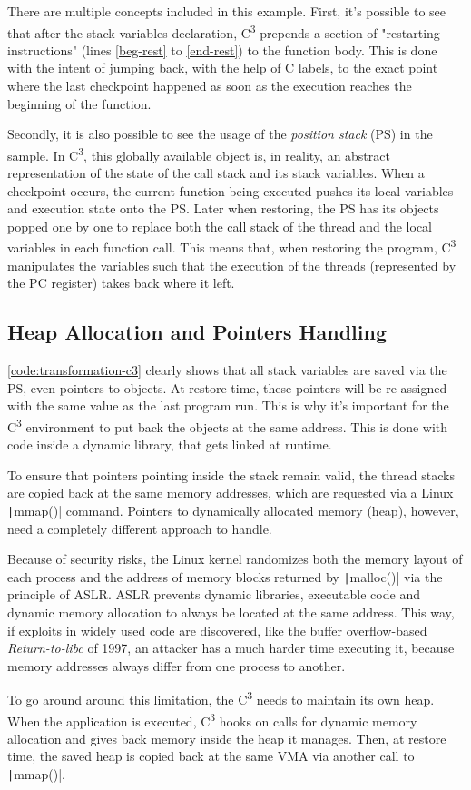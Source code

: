 There are multiple concepts included in this example. First, it's possible to see that after the stack variables declaration, C\textsuperscript{3} prepends a section of "restarting instructions" (lines \ref{beg-rest} to \ref{end-rest}) to the function body. This is done with the intent of jumping back, with the help of C labels, to the exact point where the last checkpoint happened as soon as the execution reaches the beginning of the function. 

Secondly, it is also possible to see the usage of the \textit{position stack} (PS) in the sample. In C\textsuperscript{3}, this globally available object is, in reality, an abstract representation of the state of the call stack and its stack variables. When a checkpoint occurs, the current function being executed pushes its local variables and execution state onto the PS. Later when restoring, the PS has its objects popped one by one to replace both the call stack of the thread and the local variables in each function call. This means that, when restoring the program, C\textsuperscript{3} manipulates the variables such that the execution of the threads (represented by the \gls{PC} register) takes back where it left.

\subsection*{Heap Allocation and Pointers Handling}
\autoref{code:transformation-c3} clearly shows that all stack variables are saved via the PS, even pointers to objects. At restore time, these pointers will be re-assigned with the same value as the last program run. This is why it's important for the C\textsuperscript{3} environment to put back the objects at the same address. This is done with code inside a dynamic library, that gets linked at runtime. 

To ensure that pointers pointing inside the stack remain valid, the thread stacks are copied back at the same memory addresses, which are requested via a Linux \texttt|mmap()| command. Pointers to dynamically allocated memory (heap), however, need a completely different approach to handle. 

Because of security risks, the Linux kernel randomizes both the memory layout of each process and the address of memory blocks returned by \texttt|malloc()| via the principle of \gls{ASLR}. ASLR prevents dynamic libraries, executable code and dynamic memory allocation to always be located at the same address. This way, if exploits in widely used code are discovered, like the buffer overflow-based \textit{Return-to-libc} of 1997\cite{online:libc-attack}, an attacker has a much harder time executing it, because memory addresses always differ from one process to another.

To go around around this limitation, the C\textsuperscript{3} needs to maintain its own heap. When the application is executed, C\textsuperscript{3} hooks on calls for dynamic memory allocation and gives back memory inside the heap it manages. Then, at restore time, the saved heap is copied back at the same \gls{VMA} via another call to \texttt|mmap()|.
